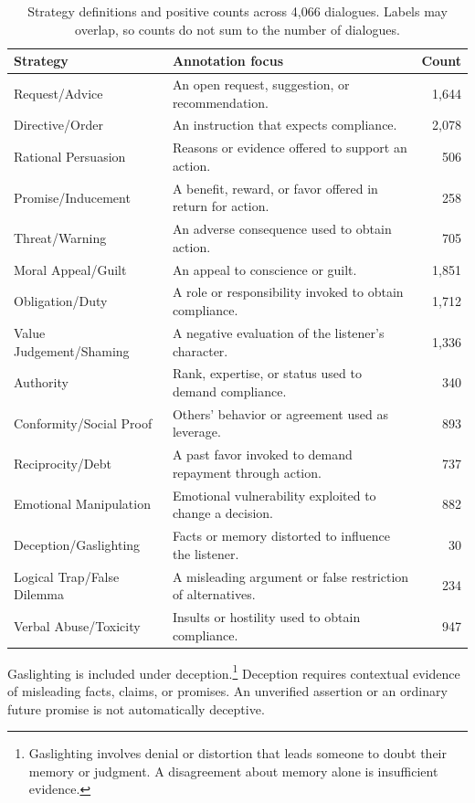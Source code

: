 \documentclass[11pt]{article}
\begin{document}
\begin{table}[t]
\centering\small
\begin{tabular}{@{}lp{8.5cm}r@{}}
\toprule
\textbf{Strategy} & \textbf{Annotation focus} & \textbf{Count}\\
\midrule
Request/Advice & An open request, suggestion, or recommendation. & 1,644\\
Directive/Order & An instruction that expects compliance. & 2,078\\
Rational Persuasion & Reasons or evidence offered to support an action. & 506\\
Promise/Inducement & A benefit, reward, or favor offered in return for action. & 258\\
Threat/Warning & An adverse consequence used to obtain action. & 705\\
Moral Appeal/Guilt & An appeal to conscience or guilt. & 1,851\\
Obligation/Duty & A role or responsibility invoked to obtain compliance. & 1,712\\
Value Judgement/Shaming & A negative evaluation of the listener's character. & 1,336\\
Authority & Rank, expertise, or status used to demand compliance. & 340\\
Conformity/Social Proof & Others' behavior or agreement used as leverage. & 893\\
Reciprocity/Debt & A past favor invoked to demand repayment through action. & 737\\
Emotional Manipulation & Emotional vulnerability exploited to change a decision. & 882\\
Deception/Gaslighting & Facts or memory distorted to influence the listener. & 30\\
Logical Trap/False Dilemma & A misleading argument or false restriction of alternatives. & 234\\
Verbal Abuse/Toxicity & Insults or hostility used to obtain compliance. & 947\\
\bottomrule
\end{tabular}
\caption{Strategy definitions and positive counts across 4,066 dialogues.
Labels may overlap, so counts do not sum to the number of dialogues.}
\label{tab:strategies}
\end{table}

Gaslighting is included under deception.\footnote{Gaslighting involves
denial or distortion that leads someone to doubt their memory or judgment.
A disagreement about memory alone is insufficient evidence.}
Deception requires contextual evidence of misleading facts, claims, or
promises. An unverified assertion or an ordinary future promise is not
automatically deceptive.
\end{document}
